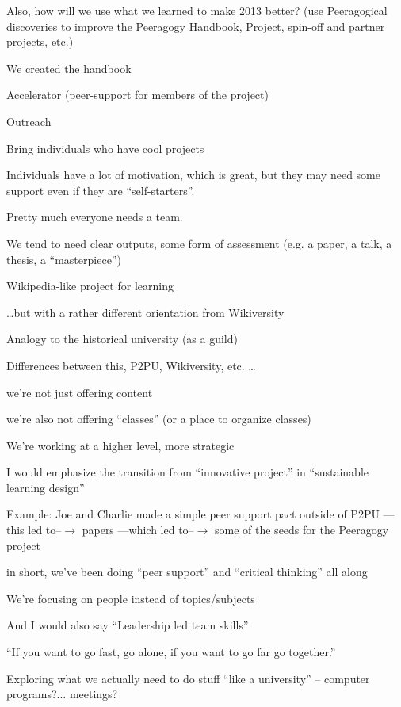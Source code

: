 \documentclass{acm_proc_article-sp}
\begin{document}
Also, how will we use what we learned to make 2013 better? (use
Peeragogical discoveries to improve the Peeragogy Handbook, Project,
spin-off and partner projects, etc.)

We created the handbook

Accelerator (peer-support for members of the project)

Outreach

Bring individuals who have cool projects

Individuals have a lot of motivation, which is great, but they may need some support even if they are ``self-starters''.

Pretty much everyone needs a team.

We tend to need clear outputs, some form of assessment (e.g. a paper,
a talk, a thesis, a ``masterpiece'')

Wikipedia-like project for learning

            \ldots but with a rather different orientation from Wikiversity

            Analogy to the historical university (as a guild) 

        Differences between this, P2PU, Wikiversity, etc. \ldots

            we're not just offering content

            we're also not offering ``classes'' (or a place to organize classes)

            We're working at a higher level, more strategic

            I would emphasize the transition from ``innovative project'' in ``sustainable learning design''

            Example: Joe and Charlie made a simple peer support pact outside of P2PU ---this led to--$\rightarrow$ papers ---which led to--$\rightarrow$ some of the seeds for the Peeragogy project

                in short, we've been doing ``peer support'' and ``critical thinking'' all along

            We're focusing on people instead of topics/subjects

            And I would also say ``Leadership led team skills''

        ``If you want to go fast, go alone, if you want to go far go together.''

        Exploring what we actually need to do stuff ``like a university'' -- computer programs?... meetings?
\end{document}
